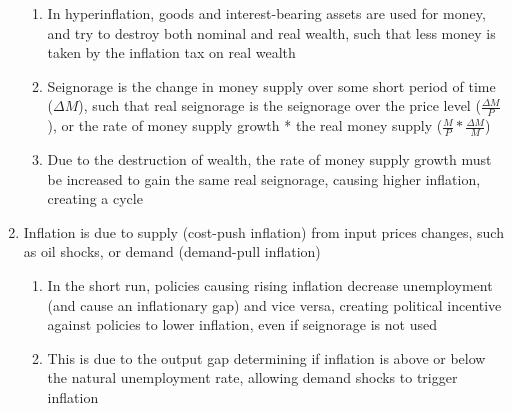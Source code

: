 \documentclass[11 pt, twoside]{article}
\begin{document}
\begin{enumerate}
\begin{enumerate}
\item In hyperinflation, goods and interest-bearing assets are used for money, and try to destroy both nominal and real wealth, such that less money is taken by the inflation tax on real wealth
\item Seignorage is the change in money supply over some short period of time ($\Delta M$), such that real seignorage is the seignorage over the price level ($\frac{\Delta M}{P}$), or the rate of money supply growth * the real money supply ($\frac{M}{P}*\frac{\Delta M}{M}$)
\item Due to the destruction of wealth, the rate of money supply growth must be increased to gain the same real seignorage, causing higher inflation, creating a cycle
\end{enumerate}
\item Inflation is due to supply (cost-push inflation) from input prices changes, such as oil shocks, or demand (demand-pull inflation)
\begin{enumerate}
\item In the short run, policies causing rising inflation decrease unemployment (and cause an inflationary gap) and vice versa, creating political incentive against policies to lower inflation, even if seignorage is not used
\item This is due to the output gap determining if inflation is above or below the natural unemployment rate, allowing demand shocks to trigger inflation
\end{enumerate}
\end{enumerate}
\end{document}
